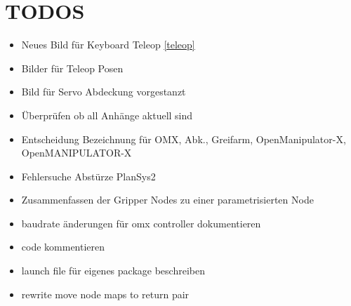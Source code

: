 \section{TODOS}
\begin{itemize}
\item Neues Bild für Keyboard Teleop \ref{teleop}
\item Bilder für Teleop Posen
\item Bild für Servo Abdeckung vorgestanzt
\item Überprüfen ob all Anhänge aktuell sind
\item Entscheidung Bezeichnung für OMX, Abk., Greifarm, OpenManipulator-X, OpenMANIPULATOR-X
\item Fehlersuche Abstürze PlanSys2
\item Zusammenfassen der Gripper Nodes zu einer parametrisierten Node
\item baudrate änderungen für omx controller dokumentieren
\item code kommentieren
\item launch file für eigenes package beschreiben
\item rewrite move node maps to return pair
\end{itemize}